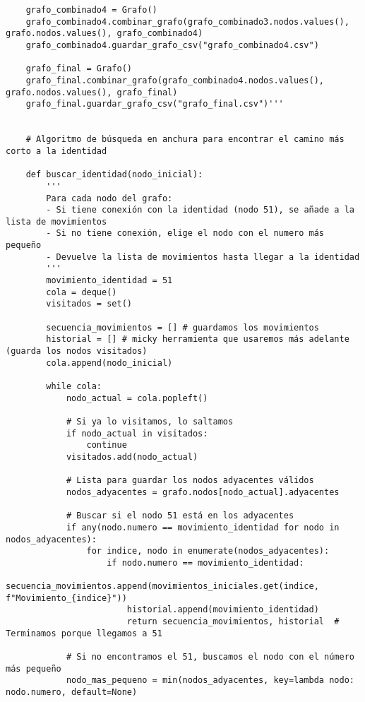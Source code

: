 \begin{lstlisting}
    grafo_combinado4 = Grafo()
    grafo_combinado4.combinar_grafo(grafo_combinado3.nodos.values(), grafo.nodos.values(), grafo_combinado4)
    grafo_combinado4.guardar_grafo_csv("grafo_combinado4.csv")
    
    grafo_final = Grafo()
    grafo_final.combinar_grafo(grafo_combinado4.nodos.values(), grafo.nodos.values(), grafo_final)
    grafo_final.guardar_grafo_csv("grafo_final.csv")'''
    
    
    # Algoritmo de búsqueda en anchura para encontrar el camino más corto a la identidad
    
    def buscar_identidad(nodo_inicial):
        ''' 
        Para cada nodo del grafo:
        - Si tiene conexión con la identidad (nodo 51), se añade a la lista de movimientos
        - Si no tiene conexión, elige el nodo con el numero más pequeño
        - Devuelve la lista de movimientos hasta llegar a la identidad
        '''
        movimiento_identidad = 51
        cola = deque()
        visitados = set()
        
        secuencia_movimientos = [] # guardamos los movimientos
        historial = [] # micky herramienta que usaremos más adelante (guarda los nodos visitados)
        cola.append(nodo_inicial)
        
        while cola:
            nodo_actual = cola.popleft()
            
            # Si ya lo visitamos, lo saltamos
            if nodo_actual in visitados:
                continue
            visitados.add(nodo_actual)
            
            # Lista para guardar los nodos adyacentes válidos
            nodos_adyacentes = grafo.nodos[nodo_actual].adyacentes
            
            # Buscar si el nodo 51 está en los adyacentes
            if any(nodo.numero == movimiento_identidad for nodo in nodos_adyacentes):
                for indice, nodo in enumerate(nodos_adyacentes):
                    if nodo.numero == movimiento_identidad:
                        secuencia_movimientos.append(movimientos_iniciales.get(indice, f"Movimiento_{indice}"))
                        historial.append(movimiento_identidad)
                        return secuencia_movimientos, historial  # Terminamos porque llegamos a 51
            
            # Si no encontramos el 51, buscamos el nodo con el número más pequeño
            nodo_mas_pequeno = min(nodos_adyacentes, key=lambda nodo: nodo.numero, default=None)
            

\end{lstlisting}
